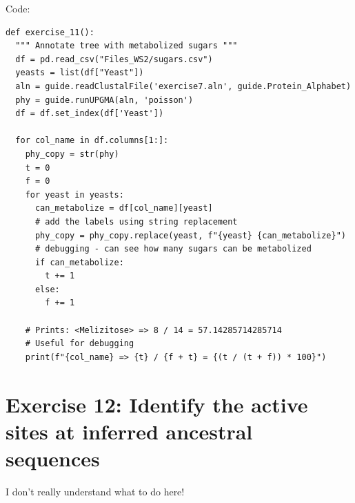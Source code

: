 \documentclass{article} %
\begin{document}
Code:

\begin{verbatim}
def exercise_11():
  """ Annotate tree with metabolized sugars """
  df = pd.read_csv("Files_WS2/sugars.csv")
  yeasts = list(df["Yeast"])                        
  aln = guide.readClustalFile('exercise7.aln', guide.Protein_Alphabet)
  phy = guide.runUPGMA(aln, 'poisson')
  df = df.set_index(df['Yeast'])

  for col_name in df.columns[1:]:
    phy_copy = str(phy)
    t = 0
    f = 0
    for yeast in yeasts:
      can_metabolize = df[col_name][yeast]
      # add the labels using string replacement
      phy_copy = phy_copy.replace(yeast, f"{yeast} {can_metabolize}")
      # debugging - can see how many sugars can be metabolized
      if can_metabolize: 
        t += 1
      else:
        f += 1

    # Prints: <Melizitose> => 8 / 14 = 57.14285714285714
    # Useful for debugging
    print(f"{col_name} => {t} / {f + t} = {(t / (t + f)) * 100}")
\end{verbatim}

\section{Exercise 12: Identify the active sites at inferred ancestral sequences}

I don't really understand what to do here!
\end{document}
